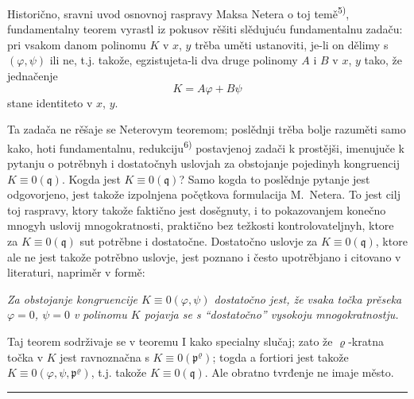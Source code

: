 \documentclass[11pt]{article}
\theoremstyle{plain}
\begin{document}
Historično, sravni uvod osnovnoj raspravy Maksa Netera o toj
temě\textsuperscript{5)}, fundamentalny teorem vyrastl iz pokusov
rěšiti slědujuću fundamentalnu zadaču: pri vsakom danom polinomu
$K$ v $x$, $y$ trěba uměti ustanoviti, je-li on dělimy s
$(\varphi, \psi)$ ili ne, t.j. takože, egzistujeta-li dva druge
polinomy $A$ i $B$ v $x$, $y$ tako, že jednačenje
\[
K = A\varphi + B\psi
\]
stane identiteto v $x$, $y$.

Ta zadača ne rěšaje se Neterovym teoremom; poslědnji trěba bolje
razuměti samo kako, hoti fundamentalnu, redukciju\textsuperscript{6)}
postavjenoj zadači k prostějši, imenujuče k pytanju o potrěbnyh i
dostatočnyh uslovjah za obstojanje pojedinyh kongruencij
$K \equiv 0(\mathfrak{q})$. Kogda jest $K \equiv 0(\mathfrak{q})$?
Samo kogda to poslědnje pytanje jest odgovorjeno, jest takože
izpolnjena počętkova formulacija M.\ Netera. To jest cilj toj
raspravy, ktory takože faktično jest dosěgnuty, i to pokazovanjem
konečno mnogyh uslovij mnogokratnosti, praktično bez težkosti
kontrolovateljnyh, ktore za $K \equiv 0(\mathfrak{q})$ sut
potrěbne i dostatočne. Dostatočno uslovje za
$K \equiv 0(\mathfrak{q})$, ktore ale ne jest takože potrěbno
uslovje, jest poznano i često upotrěbjano i citovano v literaturi,
napriměr v formě:

\smallskip
\textit{Za obstojanje kongruencije $K \equiv 0(\varphi, \psi)$
dostatočno jest, že vsaka točka prěseka $\varphi = 0$, $\psi = 0$
v polinomu $K$ pojavja se s ``dostatočno'' vysokoju mnogokratnostju.}

\smallskip
Taj teorem sodrživaje se v teoremu I kako specialny slučaj; zato že
$\varrho$-kratna točka v $K$ jest ravnoznačna s
$K \equiv 0(\mathfrak{p}^{\varrho})$; togda a fortiori jest takože
$K \equiv 0(\varphi, \psi, \mathfrak{p}^{\varrho})$, t.j. takože
$K \equiv 0(\mathfrak{q})$. Ale obratno tvrđenje ne imaje město.

\vspace{0.5em}
\noindent\rule{\textwidth}{0.4pt}
\vspace{0.3em}
\end{document}
